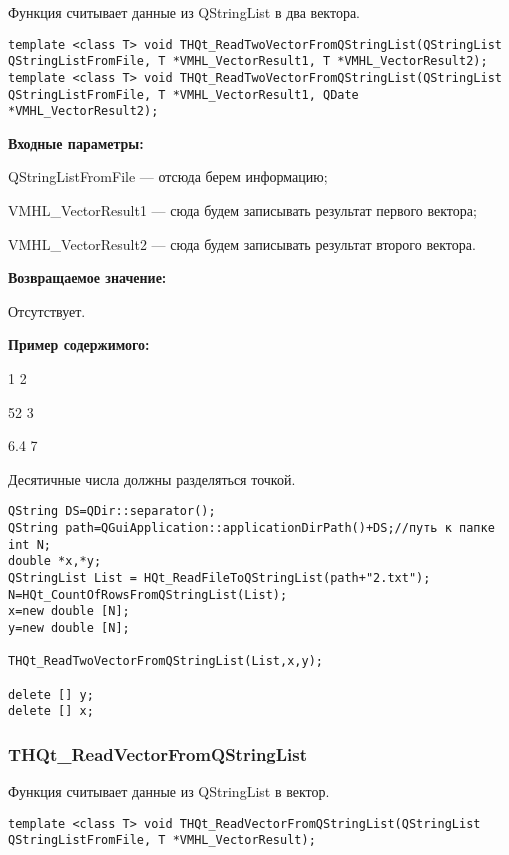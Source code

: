 \documentclass[a4paper,12pt]{article}
\begin{document}
Функция считывает данные из QStringList в два вектора.


\begin{lstlisting}[label=code_syntax_THQt_ReadTwoVectorFromQStringList,caption=Синтаксис]
template <class T> void THQt_ReadTwoVectorFromQStringList(QStringList QStringListFromFile, T *VMHL_VectorResult1, T *VMHL_VectorResult2);
template <class T> void THQt_ReadTwoVectorFromQStringList(QStringList QStringListFromFile, T *VMHL_VectorResult1, QDate *VMHL_VectorResult2);
\end{lstlisting}

\textbf{Входные параметры:}
 
QStringListFromFile --- отсюда берем информацию;
 
    VMHL\_VectorResult1 --- сюда будем записывать результат первого вектора;
 
    VMHL\_VectorResult2 --- сюда будем записывать результат второго вектора.

\textbf{Возвращаемое значение:}

Отсутствует.

\textbf{Пример содержимого:}

1	2

52	3

6.4	7

Десятичные числа должны разделяться точкой.


\begin{lstlisting}[label=code_use_THQt_ReadTwoVectorFromQStringList,caption=Пример использования]
QString DS=QDir::separator();
QString path=QGuiApplication::applicationDirPath()+DS;//путь к папке
int N;
double *x,*y;
QStringList List = HQt_ReadFileToQStringList(path+"2.txt");
N=HQt_CountOfRowsFromQStringList(List);
x=new double [N];
y=new double [N];

THQt_ReadTwoVectorFromQStringList(List,x,y);

delete [] y;
delete [] x;
\end{lstlisting}

\subsubsection{THQt\_ReadVectorFromQStringList}\label{THQt_ReadVectorFromQStringList}

Функция считывает данные из QStringList в вектор.


\begin{lstlisting}[label=code_syntax_THQt_ReadVectorFromQStringList,caption=Синтаксис]
template <class T> void THQt_ReadVectorFromQStringList(QStringList QStringListFromFile, T *VMHL_VectorResult);
\end{lstlisting}
\end{document}
